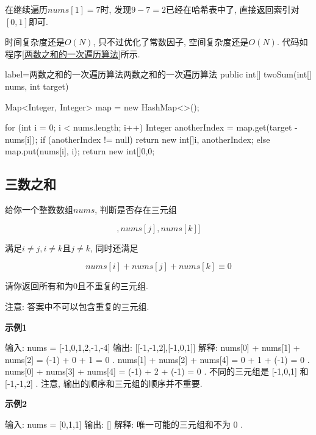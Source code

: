 \documentclass[oneside]{ctexbook}
\begin{document}
{在继续遍历$nums[1]=7$时, 发现$9-7=2$已经在哈希表中了, 直接返回索引对$[0,1]$即可.

时间复杂度还是$O(N)$, 只不过优化了常数因子, 空间复杂度还是$O(N)$. 代码如程序\ref{两数之和的一次遍历算法}所示.

\begin{myjava}{label={两数之和的一次遍历算法}}{两数之和的一次遍历算法}
public int[] twoSum(int[] nums, int target) {
    Map<Integer, Integer> map = new HashMap<>();

    for (int i = 0; i < nums.length; i++) {
        Integer anotherIndex = map.get(target - nums[i]);
        if (anotherIndex != null) {
            return new int[]{i, anotherIndex};
        } else {
            map.put(nums[i], i);
        }
    }
    return new int[]{0,0};
}
\end{myjava}

\subsection{三数之和{}}

给你一个整数数组$nums$, 判断是否存在三元组

\begin{equation*}
[nums[i], nums[j], nums[k]]
\end{equation*}

满足$i \neq j, i \neq k \text{且} j \neq k$, 同时还满足

\begin{equation*}
nums[i] + nums[j] + nums[k] \equiv 0
\end{equation*}

请你返回所有和为$0$且不重复的三元组.

注意: 答案中不可以包含重复的三元组.

\textbf{示例1}

\begin{mytext}
输入: nums = [-1,0,1,2,-1,-4]
输出: [[-1,-1,2],[-1,0,1]]
解释: 
nums[0] + nums[1] + nums[2] = (-1) + 0 + 1 = 0 .
nums[1] + nums[2] + nums[4] = 0 + 1 + (-1) = 0 .
nums[0] + nums[3] + nums[4] = (-1) + 2 + (-1) = 0 .
不同的三元组是 [-1,0,1] 和 [-1,-1,2] .
注意, 输出的顺序和三元组的顺序并不重要.
\end{mytext}

\textbf{示例2}

\begin{mytext}
输入: nums = [0,1,1]
输出: []
解释: 唯一可能的三元组和不为 0 .
\end{mytext}

}
\end{document}
